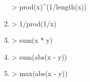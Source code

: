 \begin{exercice}
\begin{sol}
\begin{enumerate}
\begin{Schunk}
\begin{Sinput}
> prod(x)^(1/length(x))
\end{Sinput}
\end{Schunk}
    \item
\begin{Schunk}
\begin{Sinput}
> 1/prod(1/x)
\end{Sinput}
\end{Schunk}
    \item
\begin{Schunk}
\begin{Sinput}
> sum(x * y)
\end{Sinput}
\end{Schunk}
    \item
\begin{Schunk}
\begin{Sinput}
> sum(abs(x - y))
\end{Sinput}
\end{Schunk}
    \item
\begin{Schunk}
\begin{Sinput}
> max(abs(x - y))
\end{Sinput}
\end{Schunk}
    \end{enumerate}
  \end{sol}
\end{exercice}


